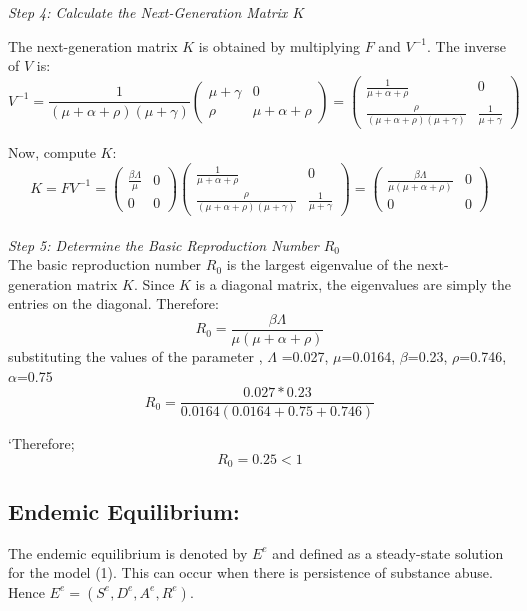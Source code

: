 \documentclass[12pt]{report}
\begin{document}
\textit{Step 4: Calculate the Next-Generation Matrix \( K \)}

The next-generation matrix \( K \) is obtained by multiplying \( F \) and \( V^{-1} \). The inverse of \( V \) is:
\[ 
V^{-1} = \frac{1}{(\mu + \alpha + \rho)(\mu + \gamma)} \begin{pmatrix}
	\mu + \gamma & 0 \\
	\rho & \mu + \alpha + \rho
\end{pmatrix}
= \begin{pmatrix}
	\frac{1}{\mu + \alpha + \rho} & 0 \\
	\frac{\rho}{(\mu + \alpha + \rho)(\mu + \gamma)} & \frac{1}{\mu + \gamma}
\end{pmatrix}
\]

Now, compute \( K \):
\[
K = F V^{-1} = \begin{pmatrix}
	\frac{\beta \Lambda}{\mu} & 0 \\
	0 & 0
\end{pmatrix}
\begin{pmatrix}
		\frac{1}{\mu + \alpha + \rho} & 0 \\
	\frac{\rho}{(\mu + \alpha + \rho)(\mu + \gamma)} & \frac{1}{\mu + \gamma}
\end{pmatrix}
= \begin{pmatrix}
	\frac{\beta \Lambda}{\mu(\mu + \alpha + \rho)} & 0 \\
	0 & 0
\end{pmatrix}
\]\\

\textit{Step 5: Determine the Basic Reproduction Number \( R_0 \)}
\\The basic reproduction number \( R_0 \) is the largest eigenvalue of the next-generation matrix \( K \). Since \( K \) is a diagonal matrix, the eigenvalues are simply the entries on the diagonal. Therefore:
\[ 
R_0  = \frac{\beta \Lambda}{\mu (\mu + \alpha + \rho)}
\]
 substituting the values of the parameter , $\Lambda$ =0.027,   $\mu$=0.0164,   $\beta$=0.23,   $\rho$=0.746,   $\alpha$=0.75
\[R_0  = \frac{ 0.027*0.23}{0.0164 (0.0164 + 0.75 + 0.746)}\]

`Therefore;\[R_0= 0.25 < 1\]

\subsection{Endemic Equilibrium:}

The endemic equilibrium is denoted by \( E^e \) and defined as a steady-state solution for the model (1). This can occur when there is persistence of substance abuse. Hence \( E^e = (S^e, D^e, A^e, R^e) \).
\end{document}
